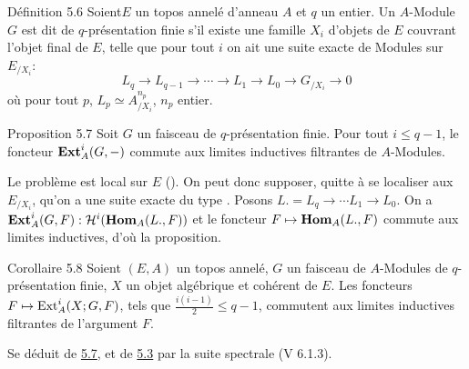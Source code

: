 \documentclass[10pt]{../fichiers-configuration-latex/smfart}
\begin{document}
\begin{enonce*}[remark]{Définition 5.6}
Soient\pageoriginale $E$ un topos annelé d'anneau $A$ et $q$ un entier. Un
$A$-Module $G$ est dit de $q$-présentation finie s'il existe une
famille $X_i$ d'objets de $E$ couvrant l'objet final de $E$, telle que
pour tout $i$ on ait une suite exacte de Modules sur $E_{/X_i}$:
\begin{equation*}
L_q \to L_{q-1} \to \cdots \to L_1 \to L_0 \to G_{/X_i} \to 0\tag{5.5.1}
\end{equation*}
où pour tout $p$, $L_p \simeq A^{n_p}_{/X_i}$, $n_p$ entier.
\end{enonce*}

\begin{enonce*}{Proposition 5.7}
Soit $G$ un faisceau de $q$-présentation finie. Pour tout $i \leq
q-1$, le foncteur $\operatorname{\mathbf{Ext}}^i_A (G, -)$ commute aux limites inductives
filtrantes de $A$-Modules.
\end{enonce*}

Le problème est local sur $E$ (). On peut donc supposer, quitte à
se localiser aux $E_{/X_i}$, qu'on a une suite exacte du type
. Posons $L. = L_q \to \cdots L_1 \to L_0$. On a $\operatorname{\mathbf{Ext}}^{i}_A(G, F)
: {\mathcal H}^{i} (\operatorname{\mathbf{Hom}}_A(L., F))$ et le foncteur $F \mapsto
\operatorname{\mathbf{Hom}}_A (L., F)$ commute aux limites inductives, d'où la proposition.

\begin{enonce*}{Corollaire 5.8}
Soient $(E, A)$ un topos annelé, $G$ un faisceau de $A$-Modules de
$q$-présentation finie, $X$ un objet algébrique et cohérent de
$E$. Les foncteurs $F \mapsto \operatorname{Ext}^{i}_A (X; G, F)$, tels que
$\frac{i(i-1)}{2} \leq q-1$, commutent aux limites inductives
filtrantes de l'argument $F$.
\end{enonce*}

Se déduit de \hyperref[VI.prop5.7]{5.7}, et de \hyperref[VI.cor5.3]{5.3} par la suite spectrale (V 6.1.3).

\setcounter{subsection}{8}
\subsection{}
\end{document}

